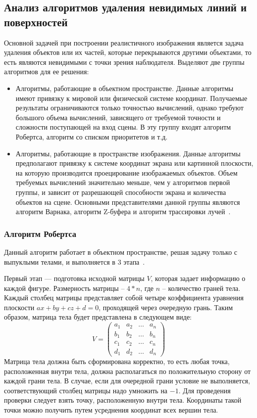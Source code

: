 \subsection{Анализ алгоритмов удаления невидимых линий и поверхностей}

Основной задачей при построении реалистичного изображения является задача удаления объектов или их частей, которые перекрываются другими объектами, то есть являются невидимыми с точки зрения наблюдателя. Выделяют две группы алгоритмов для ее решения:
\begin{itemize}
	\item Алгоритмы, работающие в объектном пространстве. Данные алгоритмы имеют привязку к мировой или физической системе координат. Получаемые результаты ограничиваются только точностью вычислений, однако требуют большого объема вычислений, зависящего от требуемой точности и сложности поступающей на вход сцены. В эту группу входят алгоритм Робертса, алгоритм со списком приоритетов и т.д.~\cite{roders} 
	\item Алгоритмы, работающие в пространстве изображения. Данные алгоритмы предполагают привязку к системе координат экрана или картинной плоскости, на которую производится проецирование изображаемых объектов. Объем требуемых вычислений значительно меньше, чем у алгоритмов первой группы, и зависит от разрешающей способности экрана и количества объектов на сцене. Основными представителями данной группы являются алгоритм Варнака, алгоритм Z-буфера и алгоритм трассировки лучей~\cite{roders}. 
\end{itemize}


\subsubsection{Алгоритм Робертса}

Данный алгоритм работает в объектном пространстве, решая задачу только с выпуклыми телами, и выполняется в 3 этапа~\cite{roders}. 

Первый этап --- подготовка исходной матрицы $V$, которая задает информацию о каждой фигуре. 
Размерность матрицы -- $4 * n$, где $n$ -- количество граней тела.
Каждый столбец матрицы представляет собой четыре коэффициента уравнения плоскости $ax + by + cz + d = 0$, проходящей через очередную грань.
Таким образом, матрица тела будет представлена в следующем виде:
\begin{equation}
	V = \begin{pmatrix}
		a_{1} & a_{2} & \ldots & a_{n}\\
		b_{1} & b_{2} & \ldots & b_{n}\\
		c_{1} & c_{2} & \ldots & c_{n}\\
		d_{1} & d_{2} & \ldots & d_{n}
	\end{pmatrix}
\end{equation}
Матрица тела должна быть сформирована корректно, то есть любая точка, расположенная внутри тела, должна располагаться по положительную сторону от каждой грани тела. 
В случае, если для очередной грани условие не выполняется, соответствующий столбец матрицы надо умножить на $-1$. 
Для проведения проверки следует взять точку, расположенную внутри тела. 
Координаты такой точки можно получить путем усреднения координат всех вершин тела.

